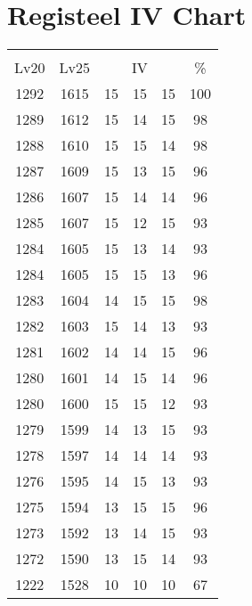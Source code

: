 \documentclass{article}%
\begin{document}
%
\normalsize%
\section{Registeel IV Chart}%
\label{sec:Registeel IV Chart}%
\renewcommand{\arraystretch}{1.5}%
\begin{tabular}{|c|c|c|c|c|c|}%
\hline%
\multicolumn{6}{|c|}{\textcolor{white}{ 
\linebreak{Registeel}
}%
\cellcolor{black}}\\%
\multicolumn{1}{|c}{Lv20}&\multicolumn{1}{c|}{Lv25}&\multicolumn{3}{c|}{IV}&\multicolumn{1}{|c|}{\%}\\%
\hline%
\rowcolor{color100}%
1292&1615&15&15&15&100\\%
\hline%
\rowcolor{color98}%
1289&1612&15&14&15&98\\%
\hline%
\rowcolor{color98}%
1288&1610&15&15&14&98\\%
\hline%
\rowcolor{color96}%
1287&1609&15&13&15&96\\%
\hline%
\rowcolor{color96}%
1286&1607&15&14&14&96\\%
\hline%
\rowcolor{color93}%
1285&1607&15&12&15&93\\%
\hline%
\rowcolor{color93}%
1284&1605&15&13&14&93\\%
\hline%
\rowcolor{color96}%
1284&1605&15&15&13&96\\%
\hline%
\rowcolor{color98}%
1283&1604&14&15&15&98\\%
\hline%
\rowcolor{color93}%
1282&1603&15&14&13&93\\%
\hline%
\rowcolor{color96}%
1281&1602&14&14&15&96\\%
\hline%
\rowcolor{color96}%
1280&1601&14&15&14&96\\%
\hline%
\rowcolor{color93}%
1280&1600&15&15&12&93\\%
\hline%
\rowcolor{color93}%
1279&1599&14&13&15&93\\%
\hline%
\rowcolor{color93}%
1278&1597&14&14&14&93\\%
\hline%
\rowcolor{color93}%
1276&1595&14&15&13&93\\%
\hline%
\rowcolor{color96}%
1275&1594&13&15&15&96\\%
\hline%
\rowcolor{color93}%
1273&1592&13&14&15&93\\%
\hline%
\rowcolor{color93}%
1272&1590&13&15&14&93\\%
\hline%
\rowcolor{color91}%
1222&1528&10&10&10&67\\%
\end{tabular}

%
\end{document}
